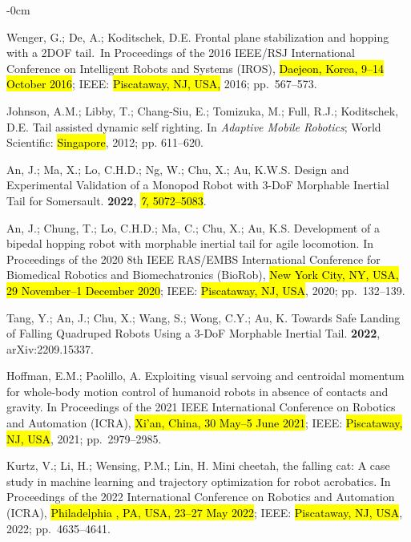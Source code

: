 \documentclass[sensors,article,accept,pdftex,moreauthors]{Definitions/mdpi}
\begin{document}
\begin{adjustwidth}{-\extralength}{0cm}
\begin{thebibliography}{999}
Wenger, G.; De, A.; Koditschek, D.E.
\newblock Frontal plane stabilization and hopping with a 2DOF tail.~In Proceedings of the 2016 IEEE/RSJ International Conference on
  Intelligent Robots and Systems (IROS), \hl{Daejeon, Korea, 9--14 October 2016}; IEEE: \hl{\mbox{Piscataway}, NJ, USA,}  2016; pp.~567--573.

Johnson, A.M.; Libby, T.; Chang-Siu, E.; Tomizuka, M.; Full, R.J.; Koditschek,
  D.E.
\newblock Tail assisted dynamic self righting. In {\em Adaptive Mobile
  Robotics}; World Scientific: \hl{Singapore},
  2012; pp. 611--620.

An, J.; Ma, X.; Lo, C.H.D.; Ng, W.; Chu, X.; Au, K.W.S.
\newblock Design and Experimental Validation of a Monopod Robot with 3-DoF
  Morphable Inertial Tail for Somersault.
 {\bf 2022}, \hl{\emph{7}, 5072--5083}.

An, J.; Chung, T.; Lo, C.H.D.; Ma, C.; Chu, X.; Au, K.S.
\newblock Development of a bipedal hopping robot with morphable inertial tail
  for agile locomotion.
\newblock In Proceedings of the 2020 8th IEEE RAS/EMBS International Conference
  for Biomedical Robotics and Biomechatronics (BioRob),  \hl{New York City, NY, USA, 29 November--1 December 2020}; IEEE: \hl{Piscataway, NJ, USA},  2020; \mbox{pp.
  132--139.}

Tang, Y.; An, J.; Chu, X.; Wang, S.; Wong, C.Y.; Au, K.
\newblock Towards Safe Landing of Falling Quadruped Robots Using a 3-DoF
  Morphable Inertial Tail.
 {\bf 2022},  arXiv:2209.15337.

Hoffman, E.M.; Paolillo, A.
\newblock Exploiting visual servoing and centroidal momentum for whole-body
  motion control of humanoid robots in absence of contacts and gravity.
\newblock In Proceedings of the 2021 IEEE International Conference on Robotics
  and Automation (ICRA), \hl{Xi'an, China, 30 May--5 June 2021}; IEEE: \hl{Piscataway, NJ, USA},  2021; pp.~2979--2985.

Kurtz, V.; Li, H.; Wensing, P.M.; Lin, H.
\newblock Mini cheetah, the falling cat: A case study in machine learning and
  trajectory optimization for robot acrobatics.
\newblock In Proceedings of the 2022 International Conference on Robotics and
  Automation (ICRA), \hl{Philadelphia , PA, USA, 23--27 May 2022}; IEEE: \hl{Piscataway, NJ, USA},  2022; pp.~4635--4641.


\end{thebibliography}
\end{adjustwidth}
\end{document}
